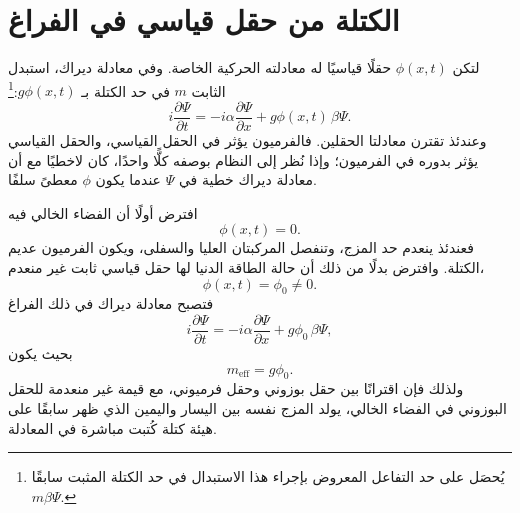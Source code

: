 \section{الكتلة من حقل قياسي في الفراغ}

\begin{classroomqa}
\end{classroomqa}

لتكن \(\phi(x,t)\) حقلًا قياسيًا له معادلته الحركية الخاصة. وفي معادلة ديراك، استبدل الثابت \(m\) في حد الكتلة بـ \(g\phi(x,t)\):\footnote{يُحصَل على حد التفاعل المعروض بإجراء هذا الاستبدال في حد الكتلة المثبت سابقًا \(m\beta\Psi\).}
\begin{equation}
i\frac{\partial\Psi}{\partial t}
=
-i\alpha\frac{\partial\Psi}{\partial x}
+g\phi(x,t)\,\beta\Psi.
\end{equation}
وعندئذ تقترن معادلتا الحقلين. فالفرميون يؤثر في الحقل القياسي، والحقل القياسي يؤثر بدوره في الفرميون؛ وإذا نُظر إلى النظام بوصفه كلًّا واحدًا، كان لاخطيًا مع أن معادلة ديراك خطية في \(\Psi\) عندما يكون \(\phi\) معطىً سلفًا.

افترض أولًا أن الفضاء الخالي فيه
\begin{equation}
\phi(x,t)=0.
\end{equation}
فعندئذ ينعدم حد المزج، وتنفصل المركبتان العليا والسفلى، ويكون الفرميون عديم الكتلة. وافترض بدلًا من ذلك أن حالة الطاقة الدنيا لها حقل قياسي ثابت غير منعدم،
\begin{equation}
\phi(x,t)=\phi_0\neq0.
\end{equation}
فتصبح معادلة ديراك في ذلك الفراغ
\begin{equation}
i\frac{\partial\Psi}{\partial t}
=
-i\alpha\frac{\partial\Psi}{\partial x}
+g\phi_0\,\beta\Psi,
\end{equation}
بحيث يكون
\begin{equation}
m_{\mathrm{eff}}=g\phi_0.
\end{equation}
ولذلك فإن اقترانًا بين حقل بوزوني وحقل فرميوني، مع قيمة غير منعدمة للحقل البوزوني في الفضاء الخالي، يولد المزج نفسه بين اليسار واليمين الذي ظهر سابقًا على هيئة كتلة كُتبت مباشرة في المعادلة.

\begin{classroomqa}
\end{classroomqa}

